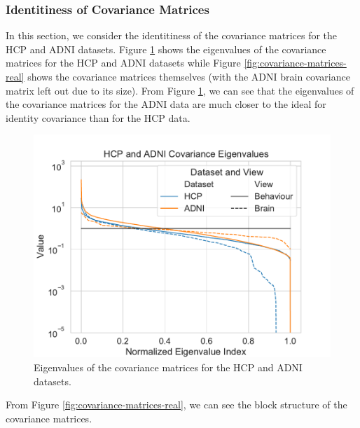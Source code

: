 \subsubsection{Identitiness of Covariance Matrices}
In this section, we consider the identitiness of the covariance matrices for the HCP and ADNI datasets.
Figure \ref{fig:covariance-eigenvalues-real} shows the eigenvalues of the covariance matrices for the HCP and ADNI datasets while Figure \ref{fig:covariance-matrices-real} shows the covariance matrices themselves (with the ADNI brain covariance matrix left out due to its size).
From Figure \ref{fig:covariance-eigenvalues-real}, we can see that the eigenvalues of the covariance matrices for the ADNI data are much closer to the ideal for identity covariance than for the HCP data.
\begin{figure}
\centering
\includegraphics[width=0.8\linewidth]{figures/regularization/covariance/hcp_adni_covariance_eigenvalues}
\caption{Eigenvalues of the covariance matrices for the HCP and ADNI datasets.}\label{fig:covariance-eigenvalues-real}
\end{figure}

From Figure \ref{fig:covariance-matrices-real}, we can see the block structure of the covariance matrices.

